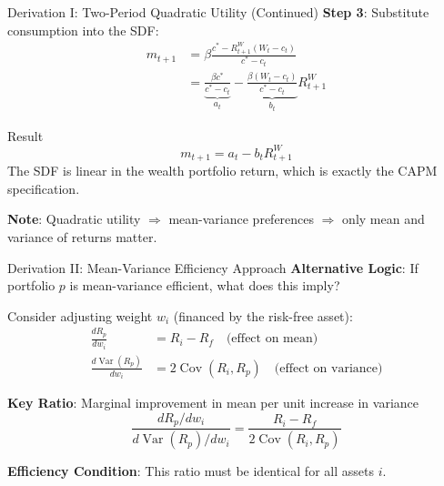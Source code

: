 \documentclass{beamer}
\begin{document}
\begin{frame}{Derivation I: Two-Period Quadratic Utility (Continued)}
	\textbf{Step 3}: Substitute consumption into the SDF:
	\begin{align*}
		m_{t+1} &= \beta \frac{c^* - R^W_{t+1}(W_t - c_t)}{c^* - c_t} \\[8pt]
		&= \underbrace{\frac{\beta c^*}{c^* - c_t}}_{a_t} - \underbrace{\frac{\beta(W_t - c_t)}{c^* - c_t}}_{b_t} R^W_{t+1}
	\end{align*}
	
	\begin{block}{Result}
		\begin{equation*}
			m_{t+1} = a_t - b_t R^W_{t+1}
		\end{equation*}
		The SDF is \alert{linear in the wealth portfolio return}, which is exactly the CAPM specification.
	\end{block}

	\textbf{Note}: Quadratic utility $\Rightarrow$ mean-variance preferences $\Rightarrow$ only mean and variance of returns matter.
\end{frame}

\begin{frame}{Derivation II: Mean-Variance Efficiency Approach}
	\textbf{Alternative Logic}: If portfolio $p$ is mean-variance efficient, what does this imply?

	Consider adjusting weight $w_i$ (financed by the risk-free asset):
	\begin{align*}
		\frac{dR_p}{dw_i} &= R_i - R_f \quad \text{(effect on mean)} \\[5pt]
		\frac{d\operatorname{Var}(R_p)}{dw_i} &= 2\operatorname{Cov}(R_i, R_p) \quad \text{(effect on variance)}
	\end{align*}

	\textbf{Key Ratio}: Marginal improvement in mean per unit increase in variance
	\begin{equation*}
		\frac{dR_p/dw_i}{d\operatorname{Var}(R_p)/dw_i} = \frac{R_i - R_f}{2\operatorname{Cov}(R_i, R_p)}
	\end{equation*}
	
	\vspace{5pt}
	\textbf{Efficiency Condition}: This ratio must be \alert{identical for all assets} $i$.
\end{frame}
\end{document}
